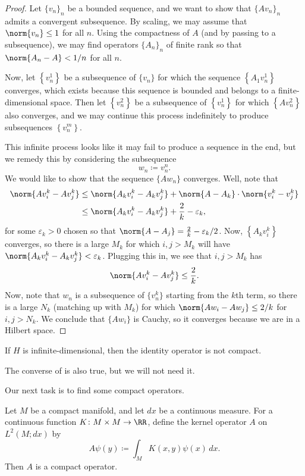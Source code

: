 \documentclass[../notes.tex]{subfiles}
\begin{document}
\begin{proof}
	Let $\{v_n\}_n$ be a bounded sequence, and we want to show that $\{Av_n\}_n$ admits a convergent subsequence. By scaling, we may assume that $\norm{v_n}\le1$ for all $n$. Using the compactness of $A$ (and by passing to a subsequence), we may find operators $\{A_n\}_n$ of finite rank so that $\norm{A_n-A}<1/n$ for all $n$.

	Now, let $\left\{v_n^1\right\}$ be a subsequence of $\{v_n\}$ for which the sequence $\left\{A_1v^1_n\right\}$ converges, which exists because this sequence is bounded and belongs to a finite-dimensional space. Then let $\left\{v_n^2\right\}$ be a subsequence of $\left\{v_n^1\right\}$ for which $\left\{Av^2_n\right\}$ also converges, and we may continue this process indefinitely to produce subsequences $\left\{v_n^m\right\}$.

	This infinite process looks like it may fail to produce a sequence in the end, but we remedy this by considering the subsequence
	\[w_n\coloneqq v^n_n.\]
	We would like to show that the sequence $\{Aw_n\}$ converges. Well, note that
	\begin{align*}
		\norm{Av_i^k-Av_j^k} &\le \norm{A_kv_i^k-A_kv_j^k}+\norm{A-A_k}\cdot\norm{v_i^k-v_j^k} \\
		&\le \norm{A_kv_i^k-A_kv_j^k}+\frac2k-\varepsilon_k,
	\end{align*}
	for some $\varepsilon_k>0$ chosen so that $\norm{A-A_j}=\frac2k-\varepsilon_k/2$. Now, $\left\{A_kv^k_i\right\}$ converges, so there is a large $M_k$ for which $i,j>M_k$ will have $\norm{A_kv_i^k-A_kv_j^k}<\varepsilon_k$. Plugging this in, we see that $i,j>M_k$ has
	\[\norm{Av_i^k-Av_j^k}\le\frac2k.\]
	Now, note that $w_n$ is a subsequence of $\{v^k_n\}$ starting from the $k$th term, so there is a large $N_k$ (matching up with $M_k$) for which $\norm{Aw_i-Aw_j}\le2/k$ for $i,j>N_k$. We conclude that $\{Aw_i\}$ is Cauchy, so it converges because we are in a Hilbert space.
\end{proof}
\begin{nex}
	If $H$ is infinite-dimensional, then the identity operator is not compact.
\end{nex}
\begin{remark}
	The converse of  is also true, but we will not need it.
\end{remark}
Our next task is to find some compact operators.
\begin{lemma} \label{lem:kernel-is-compact}
	Let $M$ be a compact manifold, and let $dx$ be a continuous measure. For a continuous function $K\colon M\times M\to\RR$, define the kernel operator $A$ on $L^2(M;dx)$ by
	\[A\psi(y)\coloneqq\int_MK(x,y)\psi(x)\,dx.\]
	Then $A$ is a compact operator.
\end{lemma}
\end{document}
